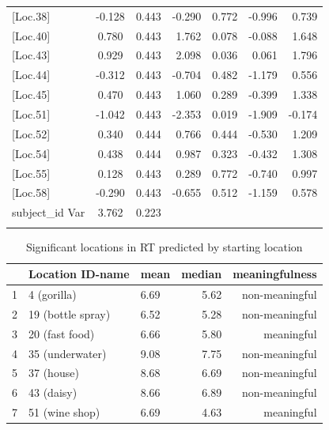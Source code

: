 \begin{longtable}{@{\extracolsep{\fill}}p{2.8cm}clrrrr@{}}
	{[}Loc.38{]}    & -0.128 & 0.443 & -0.290 & 0.772 & -0.996 & 0.739  \\
	{[}Loc.40{]}    & 0.780  & 0.443 & 1.762  & 0.078 & -0.088 & 1.648  \\
	 \setrow{\bfseries} {[}Loc.43{]}    & \setrow{\bfseries}  0.929  & \setrow{\bfseries}  0.443 & \setrow{\bfseries}  2.098  & \setrow{\bfseries}  0.036 & \setrow{\bfseries}  0.061  & \setrow{\bfseries}  1.796  \\
	{[}Loc.44{]}    & -0.312 & 0.443 & -0.704 & 0.482 & -1.179 & 0.556  \\
	{[}Loc.45{]}    & 0.470  & 0.443 & 1.060  & 0.289 & -0.399 & 1.338  \\
	 \setrow{\bfseries} {[}Loc.51{]}    & \setrow{\bfseries} -1.042 & \setrow{\bfseries}  0.443 & \setrow{\bfseries}  -2.353 & \setrow{\bfseries}  0.019  &\setrow{\bfseries} -1.909  &\setrow{\bfseries} -0.174 \\
	{[}Loc.52{]}    & 0.340  & 0.444 & 0.766  & 0.444 & -0.530 & 1.209  \\
	{[}Loc.54{]}    & 0.438  & 0.444 & 0.987  & 0.323 & -0.432 & 1.308  \\
	{[}Loc.55{]}    & 0.128  & 0.443 & 0.289  & 0.772 & -0.740 & 0.997  \\
	{[}Loc.58{]}    & -0.290 & 0.443 & -0.655 & 0.512 & -1.159 & 0.578  \\
	subject\_id Var & 3.762  & 0.223 &  {}    &  {}   &  {}    &   {}   \\
	\hline
	
	\label{tab:RT_loc}
\end{longtable}
\endgroup

\begin{table}[h]
	\begin{center}
		\caption[Significant locations in RT predicted by starting location]{Significant locations in RT predicted by starting location} \vspace{10pt}
		\begin{tabular}{l l l r r} 
			\hline 
			{} & \setrow{\bfseries} Location ID-name & \setrow{\bfseries} mean & \setrow{\bfseries} median & \setrow{\bfseries} meaningfulness \\ [.7ex] 
			\hline\hline
			1 & 4 (gorilla)		& 		6.69 &  	5.62	& non-meaningful	  \\ 
			\hline
			2 & 19 (bottle spray)		& 		6.52 & 5.28	 	& non-meaningful 	  \\
			\hline
			3 & 20 (fast food) 			& 6.66 &	5.80	& meaningful  \\
			\hline
			4 & 35 (underwater) 	& 		9.08 & 7.75		& non-meaningful	  \\
			\hline
			5 & 37 (house) 		& 		8.68 & 6.69 		& non-meaningful  \\ 
			\hline
			6 & 43 (daisy)		& 		8.66 	& 6.89	& non-meaningful  \\ 
			\hline
			7 & 51 (wine shop)		& 		6.69 & 4.63 & meaningful  \\ 
			[1ex]
			\hline
		\end{tabular}
		\label{tab:sig_RT_loc}
	\end{center}
\end{table}

